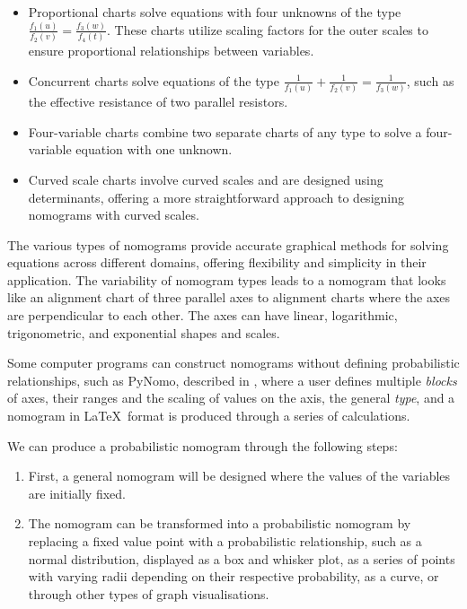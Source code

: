 \documentclass{l4proj}
\begin{document}
\begin{itemize}
    \item Proportional charts solve equations with four unknowns of the type $\frac{f_1(u)}{f_2(v)} = \frac{f_3(w)}{f_4(t)}$. These charts utilize scaling factors for the outer scales to ensure proportional relationships between variables.
    \item Concurrent charts solve equations of the type $\frac{1}{f_1(u)} + \frac{1}{f_2(v)} = \frac{1}{f_3(w)}$, such as the effective resistance of two parallel resistors.
    \item Four-variable charts combine two separate charts of any type to solve a four-variable equation with one unknown.
    \item Curved scale charts involve curved scales and are designed using determinants, offering a more straightforward approach to designing nomograms with curved scales.
\end{itemize}
The various types of nomograms provide accurate graphical methods for solving equations across different domains, offering flexibility and simplicity in their application. The variability of nomogram types leads to a nomogram that looks like an alignment chart of three parallel axes to alignment charts where the axes are perpendicular to each other. The axes can have linear, logarithmic, trigonometric, and exponential shapes and scales. 

Some computer programs can construct nomograms without defining probabilistic relationships, such as PyNomo, described in , where a user defines multiple \textit{blocks} of axes, their ranges and the scaling of values on the axis, the general \textit{type}, and a nomogram in \LaTeX\ format is produced through a series of calculations. 

We can produce a probabilistic nomogram through the following steps:
\begin{enumerate}
    \item First, a general nomogram will be designed where the values of the variables are initially fixed. 
    \item The nomogram can be transformed into a probabilistic nomogram by replacing a fixed value point with a probabilistic relationship, such as a normal distribution, displayed as a box and whisker plot, as a series of points with varying radii depending on their respective probability, as a curve, or through other types of graph visualisations. 
\end{enumerate}
\end{document}
